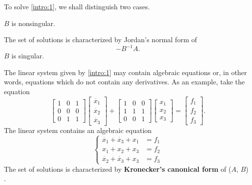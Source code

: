 To solve \eqref{intro:1}, we shall distinguish two cases.
\begin{cs}
    \case $B$ is nonsingular.

        The set of solutions is characterized by Jordan's normal form of \[-B^{-1}A.\]
    \case $B$ is singular.

        The linear system given by \eqref{intro:1} may contain algebraic equations or, in other words,
        equations which do not contain any derivatives. As an example, take the equation
        \[
            \begin{bmatrix}
                1 & 0 & 1 \\
                0 & 0 & 0 \\
                0 & 1 & 1
            \end{bmatrix}
            \begin{bmatrix}
                \dot{x_1} \\
                \dot{x_2} \\
                \dot{x_3}
            \end{bmatrix} + 
            \begin{bmatrix}
                1 & 0 & 0 \\
                1 & 1 & 1 \\
                0 & 0 & 1
            \end{bmatrix}
            \begin{bmatrix}
                x_1 \\
                x_2 \\
                x_3
            \end{bmatrix}
            = \begin{bmatrix}
                f_1 \\
                f_2 \\
                f_3
            \end{bmatrix}.
        \]
        The linear system contains an algebraic equation
        \begin{equation*}
            \left\{
                \begin{aligned}
                    \dot{x_1} + \dot{x_3} + x_1 &= f_1 \\
                    x_1 + x_2 + x_3 &= f_2 \\
                    \dot{x_2} + \dot{x_3} + x_3 &= f_3
                \end{aligned}
            \right.
        \end{equation*}
        The set of solutions is characterized by \textbf{Kronecker's canonical form} of ($A$, $B$)
        \cite{gantmacher, kunkel-mehrmann}.
\end{cs}
\vspace{5mm}

